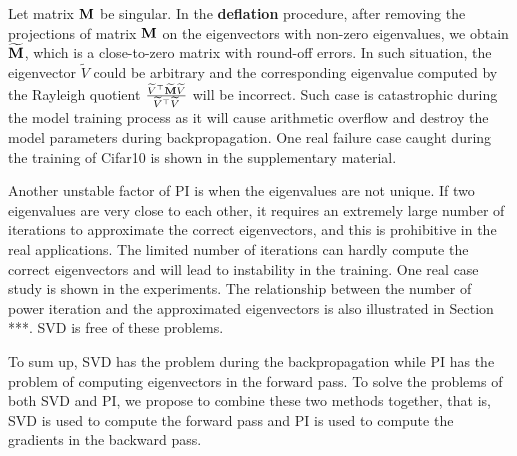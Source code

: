 Let matrix $\mathbf{M}$ be singular. In the \textbf{deflation} procedure, after removing the projections of matrix $\mathbf{M}$ on the eigenvectors with non-zero eigenvalues, we obtain $\widetilde{\mathbf{M}}$, which is a close-to-zero matrix with round-off errors. In such situation, the eigenvector $\widetilde{V}$ could be arbitrary and the corresponding eigenvalue computed by the Rayleigh quotient $\frac{\widetilde{V}^{\top} \widetilde{\mathbf{M}} \widetilde{V}}{\widetilde{V}^{\top}  \widetilde{V}}$ will be incorrect. Such case is catastrophic during the model training process as it will cause arithmetic overflow and destroy the model parameters during backpropagation. One real failure case caught during the training of Cifar10 is shown in the supplementary material.

Another unstable factor of PI is when the eigenvalues are not unique. If two eigenvalues are very close to each other, it requires an extremely large number of iterations to approximate the correct eigenvectors, and this is prohibitive in the real applications. The limited number of iterations can hardly compute the correct eigenvectors and will lead to instability in the training. One real case study is shown in the experiments. The relationship between the number of power iteration and the approximated eigenvectors is also illustrated in Section ***. SVD is free of these problems.

To sum up, SVD has the problem during the backpropagation while PI has the problem of computing eigenvectors in the forward pass.
To solve the problems of both SVD and PI, we propose to combine these two methods together, that is, SVD is used to compute the forward pass and PI is used to compute the gradients in the backward pass.